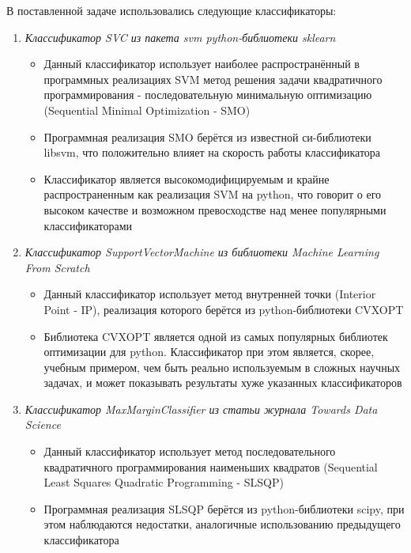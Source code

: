 \documentclass[12pt,a4paper]{article}
\begin{document}
В поставленной задаче использовались следующие классификаторы:
\begin{enumerate}
    \item \textit{Классификатор SVC из пакета svm python-библиотеки sklearn}
        \begin{itemize}
            \item Данный классификатор использует наиболее распространённый в программных реализациях SVM метод решения задачи квадратичного программирования - последовательную минимальную оптимизацию (Sequential Minimal Optimization - SMO)
            \item Программная реализация SMO берётся из известной си-библиотеки libsvm, что положительно влияет на скорость работы классификатора
            \item Классификатор является высокомодифицируемым и крайне распространенным как реализация SVM на python, что говорит о его высоком качестве и возможном превосходстве над менее популярными классификаторами
        \end{itemize}
    \item \textit{Классификатор SupportVectorMachine из библиотеки Machine Learning From Scratch}
        \begin{itemize}
            \item Данный классификатор использует метод внутренней точки (Interior Point - IP), реализация которого берётся из python-библиотеки CVXOPT
            \item Библиотека CVXOPT является одной из самых популярных библиотек оптимизации для python. Классификатор при этом является, скорее, учебным примером, чем быть реально используемым в сложных научных задачах, и может показывать результаты хуже указанных классификаторов
        \end{itemize}
    \item \textit{Классификатор MaxMarginClassifier из статьи журнала Towards Data Science}
        \begin{itemize}
            \item Данный классификатор использует метод последовательного квадратичного программирования наименьших квадратов (Sequential Least Squares Quadratic Programming - SLSQP)
            \item Программная реализация SLSQP берётся из python-библиотеки scipy, при этом наблюдаются недостатки, аналогичные использованию предыдущего классификатора
        \end{itemize}
\end{enumerate}
\end{document}
